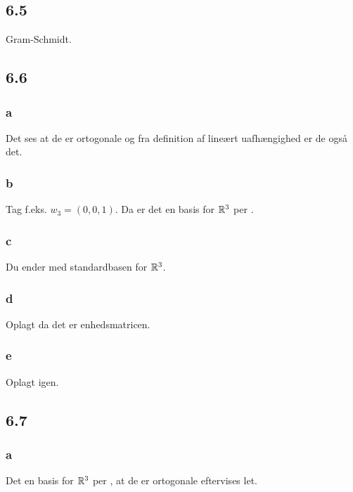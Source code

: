 		\subsection{6.5}

			Gram-Schmidt.

		\subsection{6.6}

			\subsubsection{a}

				Det ses at de er ortogonale og fra definition af lineært uafhængighed \cite[Definition 4.3.4]{hesselholt2017} er de også det.

			\subsubsection{b}

				Tag f.eks. $w_3=(0,0,1)$. Da er det en basis for $\mathbb{R}^3$ per \cite[Lemma 4.3.9]{hesselholt2017}.

			\subsubsection{c}

				Du ender med standardbasen for $\mathbb{R}^3$.

			\subsubsection{d}

				Oplagt da det er enhedsmatricen.

			\subsubsection{e}

				Oplagt igen.

		\subsection{6.7}

			\subsubsection{a}

				Det en basis for $\mathbb{R}^3$ per \cite[Lemma 4.3.9]{hesselholt2017}, at de er ortogonale eftervises let.

